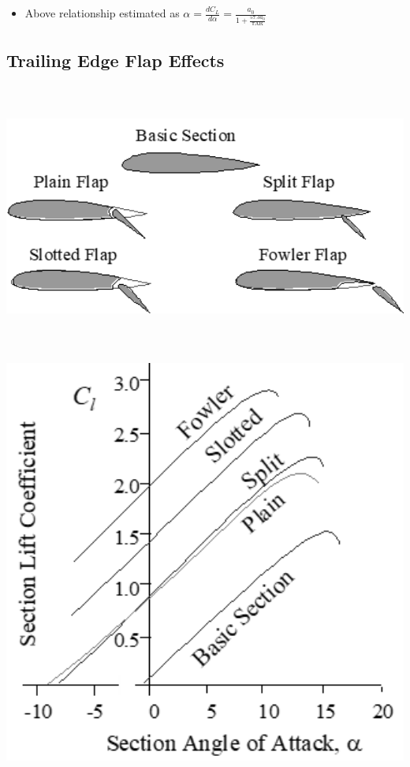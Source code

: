 \documentclass[
]{book}
\providecommand{\tightlist}{%
  \setlength{\itemsep}{0pt}\setlength{\parskip}{0pt}}
\begin{document}
\begin{itemize}
\tightlist
\item
  Above relationship estimated as \(\alpha = \frac{dC_L}{d \alpha} = \frac{a_0}{1+\frac{57.3 a_0}{\pi \mathrm{AR}}}\)
\end{itemize}

\hypertarget{trailing-edge-flap-effects}{%
\subsection*{Trailing Edge Flap Effects}\label{trailing-edge-flap-effects}}

\includegraphics[width=7in,height=3.438in]{media/05/image18.png}

\includegraphics[width=5.3in,height=5.3in]{media/05/image19.png}
\end{document}
